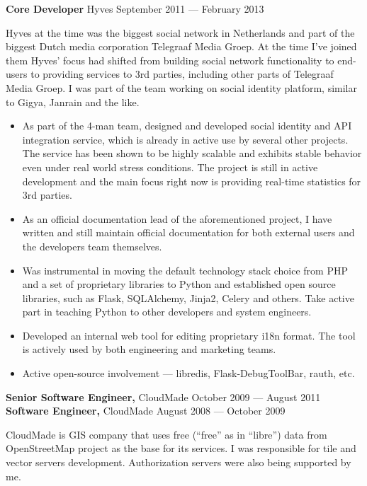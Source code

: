 \documentclass[margin]{res}
\begin{document}
\begin{resume}
{\bf Core Developer} Hyves \hfill September 2011 --- February 2013

Hyves at the time was the biggest social network in Netherlands and
part of the biggest Dutch media corporation Telegraaf Media Groep. At
the time I've joined them Hyves' focus had shifted from building
social network functionality to end-users to providing services to 3rd
parties, including other parts of Telegraaf Media Groep.  I was part of
the team working on social identity platform, similar to Gigya,
Janrain and the like.\\

\begin{itemize} \itemsep -1pt
\item As part of the 4-man team, designed and developed social identity
  and API integration service, which is already in active use by several
  other projects. The service has been shown to be highly scalable and
  exhibits stable behavior even under real world stress conditions.
  The project is still in active development and the main focus right
  now is providing real-time statistics for 3rd parties.
\item As an official documentation lead of the aforementioned project,
  I have written and still maintain official documentation for both external
  users and the developers team themselves.
\item Was instrumental in moving the default technology stack choice
  from PHP and a set of proprietary libraries to Python and established
  open source libraries, such as Flask, SQLAlchemy, Jinja2, Celery and others.
  Take active part in teaching Python to other developers and system engineers.
\item Developed an internal web tool for editing proprietary i18n format.
  The tool is actively used by both engineering and marketing teams.
\item Active open-source involvement --- libredis, Flask-DebugToolBar, rauth, etc.
\end{itemize}

{\bf Senior Software Engineer,} CloudMade \hfill October 2009 --- August 2011\\
{\bf Software Engineer,} CloudMade \hfill August 2008 --- October 2009

CloudMade is GIS company that uses free (``free'' as in ``libre'')
data from OpenStreetMap project as the base for its services. I was
responsible for tile and vector servers development. Authorization
servers were also being supported by me.\\


\end{resume}
\end{document}
